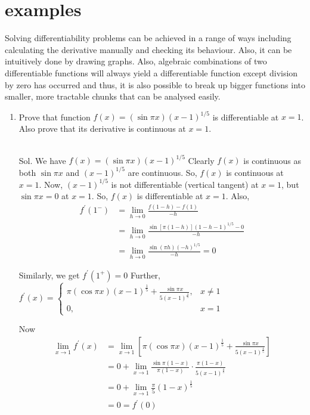 \section{examples}

Solving differentiability problems can be achieved in a range of ways including calculating the derivative manually and checking its behaviour. Also, it can be intuitively done by drawing graphs. Also, algebraic combinations of two differentiable functions will always yield a differentiable function except division by zero has occurred and thus, it is also possible to break up bigger functions into smaller, more tractable chunks that can be analysed easily. 

\begin{enumerate}
\item Prove that function $f(x)=(\sin \pi x)(x-1)^{1 / 5}$ is differentiable at $x=1$. Also prove that its derivative is continuous at $x=1$.\\\\

\begin{outline}
    Sol. We have $f(x)=(\sin \pi x)(x-1)^{1 / 5}$
Clearly $f(x)$ is continuous as both $\sin \pi x$ and $(x-1)^{1 / 5}$ are continuous.
So, $f(x)$ is continuous at $x=1$.
Now, $(x-1)^{1 / 5}$ is not differentiable (vertical tangent) at $x=1$, but $\sin \pi x=0$ at $x=1$.
So, $f(x)$ is differentiable at $x=1$.
Also,
$$
\begin{aligned}
f^{\prime}\left(1^{-}\right) & =\lim _{h \rightarrow 0} \frac{f(1-h)-f(1)}{-h} \\
& =\lim _{h \rightarrow 0} \frac{\sin [\pi(1-h)](1-h-1)^{1 / 5}-0}{-h} \\
& =\lim _{h \rightarrow 0} \frac{\sin (\pi h)(-h)^{1 / 5}}{-h}=0
\end{aligned}
$$

Similarly, we get $f^{\prime}\left(1^{+}\right)=0$
Further, $f^{\prime}(x)= \begin{cases}\pi(\cos \pi x)(x-1)^{\frac{1}{5}}+\frac{\sin \pi x}{5(x-1)^{\frac{4}{5}}}, & x \neq 1 \\ 0, & x=1\end{cases}$

Now
$$
\begin{aligned}
\lim _{x \rightarrow 1} f^{\prime}(x) & =\lim _{x \rightarrow 1}\left[\pi(\cos \pi x)(x-1)^{\frac{1}{5}}+\frac{\sin \pi x}{5(x-1)^{\frac{4}{5}}}\right] \\
& =0+\lim _{x \rightarrow 1} \frac{\sin \pi(1-x)}{\pi(1-x)} \cdot \frac{\pi(1-x)}{5(x-1)^{\frac{4}{5}}} \\
& =0+\lim _{x \rightarrow 1} \frac{\pi}{5}(1-x)^{\frac{1}{5}} \\
& =0=f^{\prime}(0)
\end{aligned}
$$


\end{outline}
\end{enumerate}
